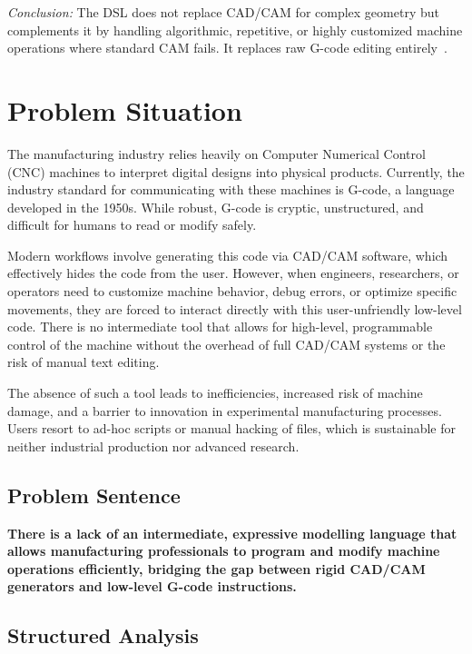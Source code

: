\textit{Conclusion:} The DSL does not replace CAD/CAM for complex geometry but complements it by handling algorithmic, repetitive, or highly customized machine operations where standard CAM fails. It replaces raw G-code editing entirely~\cite{noauthor_secrets_nodate}.

\section{Problem Situation}

The manufacturing industry relies heavily on Computer Numerical Control (CNC) machines to interpret digital designs into physical products. Currently, the industry standard for communicating with these machines is G-code, a language developed in the 1950s. While robust, G-code is cryptic, unstructured, and difficult for humans to read or modify safely.

Modern workflows involve generating this code via CAD/CAM software, which effectively hides the code from the user. However, when engineers, researchers, or operators need to customize machine behavior, debug errors, or optimize specific movements, they are forced to interact directly with this user-unfriendly low-level code. There is no intermediate tool that allows for high-level, programmable control of the machine without the overhead of full CAD/CAM systems or the risk of manual text editing.

The absence of such a tool leads to inefficiencies, increased risk of machine damage, and a barrier to innovation in experimental manufacturing processes. Users resort to ad-hoc scripts or manual hacking of files, which is sustainable for neither industrial production nor advanced research.

\subsection{Problem Sentence}
\textbf{There is a lack of an intermediate, expressive modelling language that allows manufacturing professionals to program and modify machine operations efficiently, bridging the gap between rigid CAD/CAM generators and low-level G-code instructions.}

\subsection{Structured Analysis}

